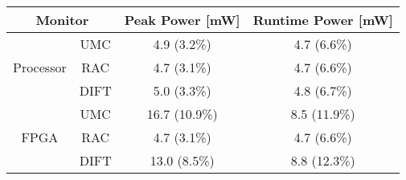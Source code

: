 

\begin{tabular}{|c|c|c|c|}
\hline

\multicolumn{2}{|c|}{\bf Monitor} & {\bf Peak Power [mW]} & {\bf Runtime Power [mW]} \\ \hline\hline

\multirow{3}{*}{Processor} 
& UMC  & 4.9 (3.2\%) & 4.7 (6.6\%) \\ \cline{2-4}
& RAC  & 4.7 (3.1\%) & 4.7 (6.6\%) \\ \cline{2-4}
& DIFT & 5.0 (3.3\%) & 4.8 (6.7\%) \\ \hline\hline

\multirow{3}{*}{FPGA} 
& UMC  & 16.7 (10.9\%) & 8.5 (11.9\%) \\ \cline{2-4}
& RAC  &  4.7  (3.1\%) & 4.7  (6.6\%) \\ \cline{2-4}
& DIFT & 13.0  (8.5\%) & 8.8 (12.3\%) \\ \hline

\end{tabular}

